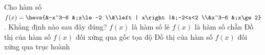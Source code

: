 \begin{ex}%
    Cho hàm số $f(x)=\heva{&-x^3-6 &;x\le-2 \\&\left| x\right|&;-2<x<2 \\&x^3-6 &;x\ge 2}$. Khẳng định nào sau đây đúng?
    \choice
    {$f(x)$ là hàm số lẻ}
    {\True $f(x)$ là hàm số chẵn}
    {Đồ thị của hàm số $f(x)$ đối xứng qua gốc tọa độ}
    {Đồ thị của hàm số $f(x)$ đối xứng qua trục hoành}
\end{ex}

